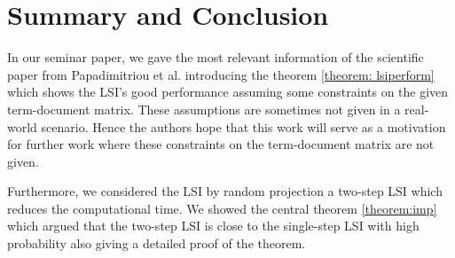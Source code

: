 \documentclass[a4paper,11pt,DIV=15]{scrartcl} %
\theoremstyle{plain}
\theoremstyle{definition}
\begin{document}









\section{Summary and Conclusion} %
In our seminar paper, we gave the most relevant information of the scientific paper from Papadimitriou et al. \cite{APAPADIMITRIOU2000217} introducing the theorem \ref{theorem: lsiperform} which shows the LSI's good performance assuming some constraints on the given term-document matrix. These assumptions are sometimes not given in a real-world scenario. Hence the authors hope that this work will serve as a motivation for further work where these constraints on the term-document matrix are not given.

Furthermore, we considered the LSI by random projection a two-step LSI which reduces the computational time. We showed the central theorem \ref{theorem:imp} which argued that the two-step LSI is close to the single-step LSI with high probability also giving a detailed proof of the theorem.










\clearpage



\end{document}
